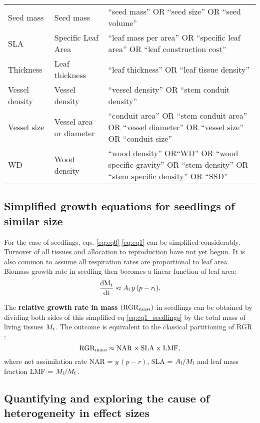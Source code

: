 \documentclass[a4paper,11pt]{article}
\newcommand{\ud}{\ensuremath{\rm{d}}}
\begin{document}
\begin{appendices}
\begin{table}[h!]
{\begin{tabular}{p{3cm}p{3cm}p{8cm}}
  Seed mass & Seed mass & ``seed mass'' OR ``seed size'' OR ``seed volume'' \\
  SLA & Specific Leaf Area & ``leaf mass per area'' OR ``specific leaf area'' OR ``leaf construction cost'' \\
  Thickness & Leaf thickness & ``leaf thickness''  OR ``leaf tissue density'' \\
  Vessel density & Vessel density & ``vessel density'' OR ``stem conduit density'' \\
  Vessel size & Vessel area or diameter & ``conduit area'' OR ``stem conduit area'' OR ``vessel diameter'' OR ``vessel size'' OR ``conduit size''   \\
  WD & Wood density & ``wood density'' OR``WD'' OR ``wood specific gravity'' OR ``stem density'' OR ``stem specific density'' OR ``SSD'' \\
   \hline
\end{tabular}
}
\end{table}

\clearpage

\subsection{Simplified growth equations for seedlings of similar size}

For the case of seedlings, eqs. \ref{eq:eq0}-\ref{eq:eq1} can be simplified considerably. Turnover of all tissues and allocation to reproduction have not yet begun. It is also common to assume all respiration rates are proportional to leaf area. Biomass growth rate in seedling then becomes a linear function of leaf area:
\begin{equation}\label{eq:eq1_seedlings}
{\frac{\ud M_{\rm t}}{\ud t}}  \approx  A_{\rm l} \, y \, (p - r_{\rm l}).
\end{equation}

The \textbf{relative growth rate in mass} $({\rm RGR}_{{\rm mass}})$ in seedlings can be obtained by dividing both sides of this simplified eq \ref{eq:eq1_seedlings} by the total mass of living tissues $M_{\rm t}$. The outcome is equivalent to the classical partitioning of RGR \citep{Lambers:1992bj, Cornelissen:1998ta}:
\begin{equation}\label{eq:eq1_seedlings_RGR}
{\rm RGR}_{{\rm mass}}  \approx {\rm NAR} \times  {\rm SLA} \times  {\rm LMF},
\end{equation}
where net assimilation rate NAR = $y \, (p - r)$, SLA = $A_{\rm l}/ M_{\rm l}$ and leaf mass fraction LMF = $M_{\rm l}/ M_{\rm t}$.


\subsection{Quantifying and exploring the cause of heterogeneity in effect sizes}



\end{appendices}
\end{document}

